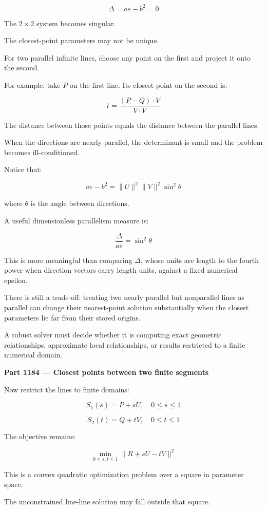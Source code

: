 \[
\Delta=ae-b^2=0
\]

The \(2\times2\) system becomes singular.

The closest-point parameters may not be unique.

For two parallel infinite lines, choose any point on the first and project it onto the second.

For example, take \(P\) on the first line. Its closest point on the second is:

\[
t=\frac{(P-Q)\cdot V}{V\cdot V}
\]

The distance between those points equals the distance between the parallel lines.

When the directions are nearly parallel, the determinant is small and the problem becomes ill-conditioned.

Notice that:

\[
ae-b^2 = \|U\|^2\|V\|^2\sin^2\theta
\]

where \(\theta\) is the angle between directions.

A useful dimensionless parallelism measure is:

\[
\boxed{ \frac{\Delta}{ae}=\sin^2\theta }
\]

This is more meaningful than comparing \(\Delta\), whose units are length to the fourth power when direction vectors carry length units, against a fixed numerical epsilon.

There is still a trade-off: treating two nearly parallel but nonparallel lines as parallel can change their nearest-point solution substantially when the closest parameters lie far from their stored origins.

A robust solver must decide whether it is computing exact geometric relationships, approximate local relationships, or results restricted to a finite numerical domain.

\textbf{Part 1184 --- Closest points between two finite segments}

Now restrict the lines to finite domains:

\[
S_1(s)=P+sU,\quad 0\le s\le1
\]

\[
S_2(t)=Q+tV,\quad 0\le t\le1
\]

The objective remains:

\[
\boxed{ \min_{0\le s,t\le1} \|R+sU-tV\|^2 }
\]

This is a convex quadratic optimization problem over a square in parameter space.

The unconstrained line-line solution may fall outside that square.


